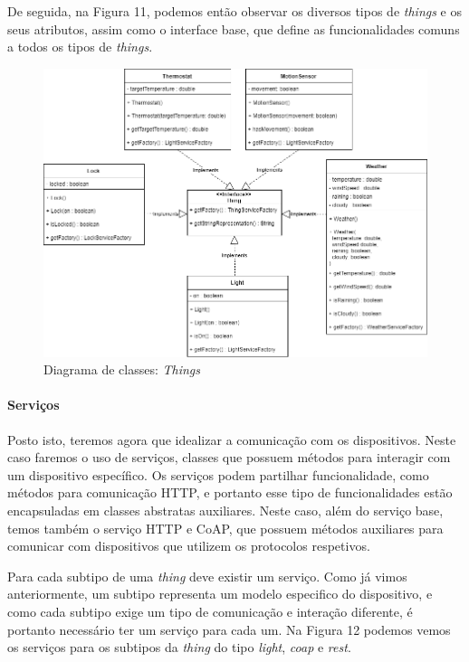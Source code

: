 De seguida, na Figura 11, podemos então observar os diversos tipos de \textit{things} e os seus atributos, assim como o interface base, que define as funcionalidades comuns a todos os tipos de \textit{things}.

\begin{figure}[H]
  \centering
        \includegraphics[scale=0.55]{img/hub-things.png}
  \caption{Diagrama de classes: \textit{Things}}
  \label{fig:things-hub}
\end{figure}

%
%
%
%

\paragraph*{Serviços}

Posto isto, teremos agora que idealizar a comunicação com os dispositivos. Neste caso faremos o uso de serviços, classes que possuem métodos para interagir com um dispositivo específico. Os serviços podem partilhar funcionalidade, como métodos para comunicação HTTP, e portanto esse tipo de funcionalidades estão encapsuladas em classes abstratas auxiliares. Neste caso, além do serviço base, temos também o serviço HTTP e CoAP, que possuem métodos auxiliares para comunicar com dispositivos que utilizem os protocolos respetivos.

Para cada subtipo de uma \textit{thing} deve existir um serviço. Como já vimos anteriormente, um subtipo representa um modelo especifico do dispositivo, e como cada subtipo exige um tipo de comunicação e interação diferente, é portanto necessário ter um serviço para cada um. Na Figura 12 podemos vemos os serviços para os subtipos da \textit{thing} do tipo \textit{light}, \textit{coap} e \textit{rest}.


